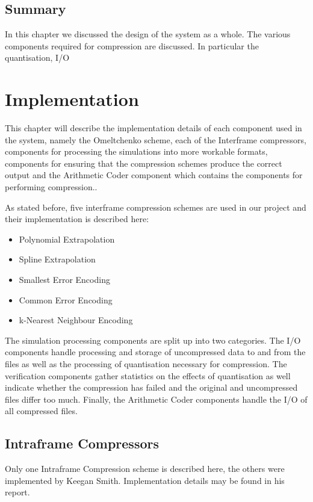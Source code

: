 \documentclass[a4paper,11pt]{report}
\begin{document}
\section{Summary}

In this chapter we discussed the design of the system as a whole. The various components required for compression are discussed. In particular the quantisation, I/O

\chapter{Implementation}

This chapter will describe the implementation details of each component used in the system, namely the Omeltchenko scheme, each of the Interframe compressors, components for processing the simulations into more workable formats, components for ensuring that the compression schemes produce the correct output and the Arithmetic Coder component which contains the components for performing compression.. 

As stated before, five interframe compression schemes are used in our project and their implementation is described here:
\begin{itemize}
 \item Polynomial Extrapolation
 \item Spline Extrapolation
 \item Smallest Error Encoding
 \item Common Error Encoding 
 \item k-Nearest Neighbour Encoding
\end{itemize}

The simulation processing components are split up into two categories. The I/O components handle processing and storage of uncompressed data to and from the files as well as the processing of quantisation necessary for compression. The verification components gather statistics on the effects of quantisation as well indicate whether the compression has failed and the original and uncompressed files differ too much. Finally, the Arithmetic Coder components handle the I/O of all compressed files.

\section{Intraframe Compressors}

Only one Intraframe Compression scheme is described here, the others were implemented by Keegan Smith. Implementation details may be found in his report.
\end{document}
